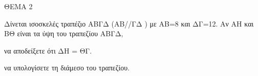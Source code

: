 
ΘΕΜΑ 2

Δίνεται ισοσκελές τραπέζιο ΑΒΓΔ (ΑΒ//ΓΔ ) με ΑΒ=8 και ΔΓ=12. Αν ΑΗ και ΒΘ είναι τα ύψη του τραπεζίου ΑΒΓΔ,

\begin{alist}
\item να αποδείξετε ότι ΔΗ = ΘΓ. 

\item να υπολογίσετε τη διάμεσο του τραπεζίου. 
\end{alist}
